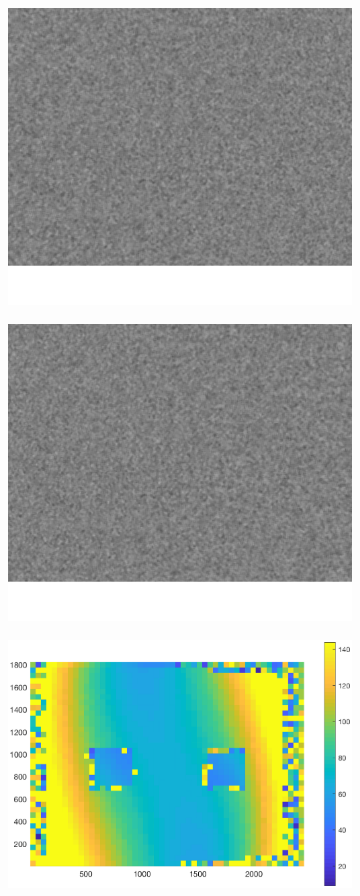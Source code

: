 \begin{figure}[h!]
	\begin{subfigure}[t]{0.3\linewidth}
		\centering
		\includegraphics[width=0.8\linewidth]{figures/part2/test_left_2}
	\end{subfigure}
	\begin{subfigure}[t]{0.3\linewidth}
		\centering
		\includegraphics[width=0.8\linewidth]{figures/part2/test_right_2}
	\end{subfigure}
	\begin{subfigure}[t]{0.35\linewidth}
		\centering
		\includegraphics[width=1\linewidth]{figures/part2/test2_cmp}

\end{subfigure}
\end{figure}
